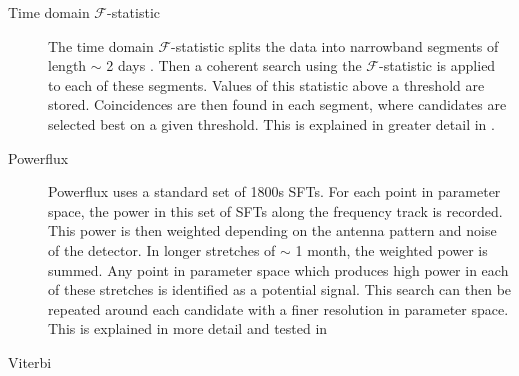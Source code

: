 \begin{description}
	\item[Time domain $\mathcal{F}$-statistic] The time domain $\mathcal{F}$-statistic splits the data into narrowband segments of length $\sim$ 2 days \citep{walsh2016ComparisonMethods}. Then a coherent search using the $\mathcal{F}$-statistic is applied to each of these segments. Values of this statistic above a threshold are stored. Coincidences are then found in each segment, where candidates are selected best on a given threshold. This is explained in greater detail in \citep{aasi2014ImplementationTextdollar,walsh2016ComparisonMethods}.
	
	
	\item[Powerflux] Powerflux uses a standard set of 1800s \acp{SFT}. For each point in parameter space, the power in this set of \acp{SFT} along the frequency track is recorded. This power is then weighted depending on the antenna pattern and noise of the detector. In longer stretches of $\sim$ 1 month, the weighted power is summed. Any point in parameter space which produces high power in each of these stretches is identified as a potential signal. This search can then be repeated around each candidate with a finer resolution in parameter space. This is explained in more detail and tested in \citep{abadie2012AllskySearch,walsh2016ComparisonMethods,ligoscientificcollaborationandvirgocollaboration2016ComprehensiveAllsky}
	
	\item[Viterbi] 
	
	
\end{description}


